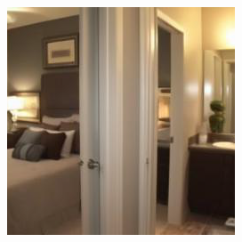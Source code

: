\begin{figure}[H]
\begin{minipage}[b]{0.3\linewidth}
  \end{minipage}
\hspace{0.1cm}
  \begin{minipage}[b]{0.3\linewidth}
    \includegraphics[width=\linewidth]{Picture/progress/random/x_0000.png}
  \end{minipage}
\end{figure}

